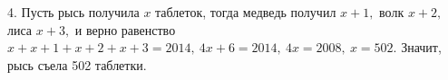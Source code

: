 4. Пусть рысь получила $x$ таблеток, тогда медведь получил $x+1,$ волк $x+2,$ лиса $x+3,$ и верно равенство $x+x+1+x+2+x+3=2014,\ 4x+6=2014,\ 4x=2008,\ x=502.$ Значит, рысь съела 502 таблетки.\\
